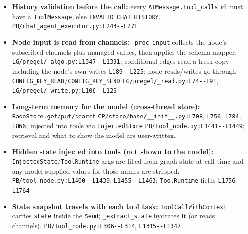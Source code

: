 \begin{itemize}
\item \textbf{History validation before the call:} every \texttt{AIMessage.\allowbreak{}tool\_\allowbreak{}calls} id must have a \texttt{ToolMessage}, else \texttt{INVALID\_\allowbreak{}CHAT\_\allowbreak{}HISTORY}. \texttt{PB/\allowbreak{}chat\_\allowbreak{}agent\_\allowbreak{}executor.\allowbreak{}py:\allowbreak{}L243-\allowbreak{}-\allowbreak{}L271}
\item \textbf{Node input is read from channels:} \texttt{\_\allowbreak{}proc\_\allowbreak{}input} collects the node's subscribed channels plus managed values, then applies the schema mapper. \texttt{LG/\allowbreak{}pregel/\allowbreak{}\_\allowbreak{}algo.\allowbreak{}py:\allowbreak{}L1347-\allowbreak{}-\allowbreak{}L1391}; conditional edges read a fresh copy including the node's own writes \texttt{L189-\allowbreak{}-\allowbreak{}L225}; node reads/writes go through \texttt{CONFIG\_\allowbreak{}KEY\_\allowbreak{}READ}/\texttt{CONFIG\_\allowbreak{}KEY\_\allowbreak{}SEND} \texttt{LG/\allowbreak{}pregel/\allowbreak{}\_\allowbreak{}read.\allowbreak{}py:\allowbreak{}L74-\allowbreak{}-\allowbreak{}L91}, \texttt{LG/\allowbreak{}pregel/\allowbreak{}\_\allowbreak{}write.\allowbreak{}py:\allowbreak{}L106-\allowbreak{}-\allowbreak{}L126}
\item \textbf{Long-term memory for the model (cross-thread store):} \texttt{BaseStore.\allowbreak{}get/\allowbreak{}put/\allowbreak{}search} \texttt{CP/\allowbreak{}store/\allowbreak{}base/\allowbreak{}\_\allowbreak{}\_\allowbreak{}init\_\allowbreak{}\_\allowbreak{}.\allowbreak{}py:\allowbreak{}L708}, \texttt{L756}, \texttt{L784}, \texttt{L866}; injected into tools via \texttt{InjectedStore} \texttt{PB/\allowbreak{}tool\_\allowbreak{}node.\allowbreak{}py:\allowbreak{}L1441-\allowbreak{}-\allowbreak{}L1449}; retrieval and what to show the model are user-written.
\item \textbf{Hidden state injected into tools (not shown to the model):} \texttt{InjectedState}/\texttt{ToolRuntime} args are filled from graph state at call time and any model-supplied values for those names are stripped. \texttt{PB/\allowbreak{}tool\_\allowbreak{}node.\allowbreak{}py:\allowbreak{}L1400-\allowbreak{}-\allowbreak{}L1439}, \texttt{L1455-\allowbreak{}-\allowbreak{}L1463}; \texttt{ToolRuntime} fields \texttt{L1756-\allowbreak{}-\allowbreak{}L1764}
\item \textbf{State snapshot travels with each tool task:} \texttt{ToolCallWithContext} carries \texttt{state} inside the \texttt{Send}; \texttt{\_\allowbreak{}extract\_\allowbreak{}state} hydrates it (or reads channels). \texttt{PB/\allowbreak{}tool\_\allowbreak{}node.\allowbreak{}py:\allowbreak{}L306-\allowbreak{}-\allowbreak{}L314}, \texttt{L1315-\allowbreak{}-\allowbreak{}L1347}

\end{itemize}
